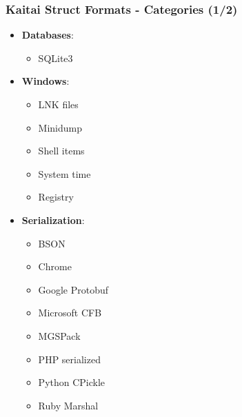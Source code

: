 \begin{frame}
\frametitle{Kaitai Struct Formats - Categories (1/2)}

\begin{itemize}
    \item \textbf{Databases}:
          \begin{itemize}
              \item SQLite3
          \end{itemize}
    \item \textbf{Windows}:
          \begin{itemize}
              \item LNK files
              \item Minidump
              \item Shell items
              \item System time
              \item Registry
          \end{itemize}
    \item \textbf{Serialization}:
          \begin{itemize}
              \item BSON
              \item Chrome
              \item Google Protobuf
              \item Microsoft CFB
              \item MGSPack
              \item PHP serialized
              \item Python CPickle
              \item Ruby Marshal
          \end{itemize}
\end{itemize}
\end{frame}

